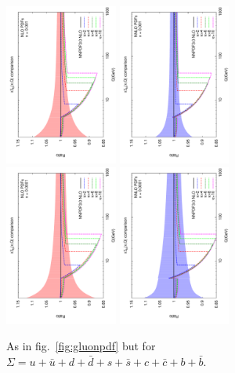 \documentclass[letter,11pt]{article}
\begin{document}
\begin{figure}[h]
\includegraphics[width=0.33\textwidth,angle=-90]{./singletb_ratio_kb_nlo_x_0001.pdf}
\includegraphics[width=0.33\textwidth,angle=-90]{./singletb_ratio_kb_nnlo_x_0001.pdf}
\includegraphics[width=0.33\textwidth,angle=-90]{./singletb_ratio_kb_nlo_x_00001.pdf}
\includegraphics[width=0.33\textwidth,angle=-90]{./singletb_ratio_kb_nnlo_x_00001.pdf}
\caption{As in fig.~\ref{fig:gluonpdf} but for $\Sigma=u+\bar{u}+d+\bar{d}+s+\bar{s}+c+\bar{c}+b+\bar{b}$.}
\label{fig:singletb}
\end{figure}
\end{document}
